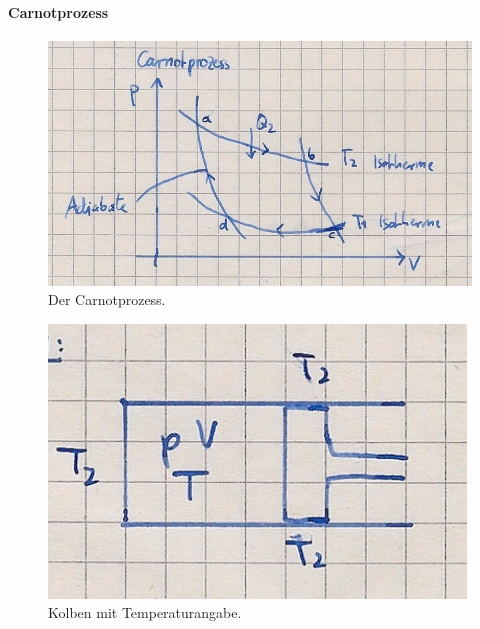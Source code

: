 \paragraph{Carnotprozess}
\begin{figure}[H]
  \centering
  \includegraphics[width = \textwidth]{Zeichnungen/20.pdf}
  \caption{Der Carnotprozess.}
\end{figure}
\begin{figure}[H]
  \centering
  \includegraphics[width = \textwidth]{Zeichnungen/21.pdf}
  \caption{Kolben mit Temperaturangabe.}
\end{figure}
